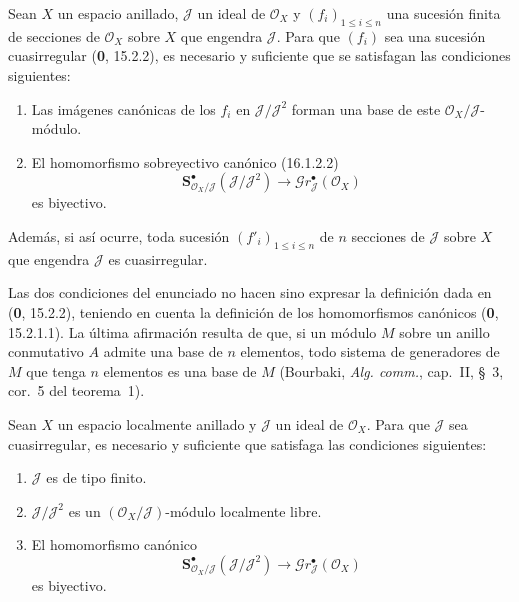 \begin{proposition}[16.9.3]
\label{IV.16.9.3}
Sean $X$ un espacio anillado, $\mathscr J$ un ideal de $\mathcal{O}_X$ y
$(f_i)_{1\leq i\leq n}$ una sucesión finita de secciones de $\mathcal{O}_X$
sobre $X$ que engendra $\mathscr J$. Para que $(f_i)$ sea una sucesión
cuasirregular \textup{(\textbf 0, 15.2.2)}, es necesario y suficiente que se satisfagan las
condiciones siguientes:
\begin{enumerate}
  \item[\textup{(i)}] Las imágenes canónicas de los $f_i$ en
  $\mathscr J/\mathscr J^2$ forman una base de este
  $\mathcal{O}_X/\mathscr J$-módulo.
  \item[\textup{(ii)}] El homomorfismo sobreyectivo canónico \textup{(16.1.2.2)}
  \[
    \mathbf{S}_{\mathcal{O}_X/\mathscr J}^{\bullet}
    (\mathscr J/\mathscr J^2)
    \longrightarrow\mathscr{G}r_{\mathscr J}^{\bullet}(\mathcal{O}_X)
  \]
  es biyectivo.
\end{enumerate}
Además, si así ocurre, toda sucesión $(f'_i)_{1\leq i\leq n}$ de $n$
secciones de $\mathscr J$ sobre $X$ que engendra $\mathscr J$ es
cuasirregular.
\end{proposition}


Las dos condiciones del enunciado no hacen sino expresar la definición dada
en (\textbf 0, 15.2.2), teniendo en cuenta la definición de los homomorfismos
canónicos (\textbf 0, 15.2.1.1). La última afirmación resulta de que, si un módulo $M$
sobre un anillo conmutativo $A$ admite una base de $n$ elementos, todo sistema
de generadores de $M$ que tenga $n$ elementos es una base de $M$ (Bourbaki,
\emph{Alg. comm.}, cap.~II, §~3, cor.~5 del teorema~1).

\begin{corollary}[16.9.4]
\label{IV.16.9.4}
Sean $X$ un espacio localmente anillado y $\mathscr J$ un ideal de
$\mathcal{O}_X$. Para que $\mathscr J$ sea cuasirregular, es necesario y
suficiente que satisfaga las condiciones siguientes:
\begin{enumerate}
  \item[\textup{(i)}] $\mathscr J$ es de tipo finito.
  \item[\textup{(ii)}] $\mathscr J/\mathscr J^2$ es un
  $(\mathcal{O}_X/\mathscr J)$-módulo localmente libre.
  \item[\textup{(iii)}] El homomorfismo canónico
  \[
    \mathbf{S}_{\mathcal{O}_X/\mathscr J}^{\bullet}
    (\mathscr J/\mathscr J^2)
    \longrightarrow\mathscr{G}r_{\mathscr J}^{\bullet}(\mathcal{O}_X)
    \tag{16.9.4.1}
    \label{IV.16.9.4.1}
  \]
  es biyectivo.
\end{enumerate}
\end{corollary}

